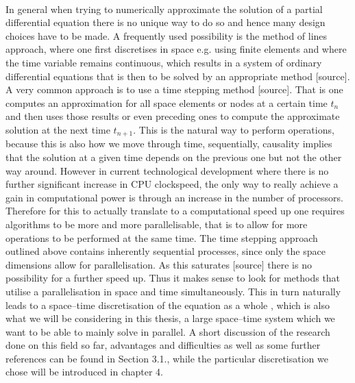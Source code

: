 \documentclass[../draft_1.tex]{subfiles}
\begin{document}
\smallskip
\\
In general when trying to numerically approximate the solution of a partial differential equation there is no unique way to do so and hence many design choices have to be made. A frequently used possibility is the method of lines approach, where one first discretises in space  e.g. using finite elements and where the time variable remains continuous, which results in a system of ordinary differential equations that is then to be solved by an appropriate method [source]. A very common approach is to use a time stepping method [source]. That is one computes an approximation for all space elements or nodes at a certain time $t_n$ and then uses those results or even preceding ones to compute the approximate solution at the next time $t_{n+1}$. This is the natural way to perform operations, because this is also how we move through time, sequentially, causality implies that the solution at a given time depends on the previous one but not the other way around. 
However in current technological development where there is no further significant increase in CPU clockspeed, the only way to really achieve a gain in computational power is through an increase in the number of processors. Therefore for this to actually translate to a computational speed up one requires algorithms to be more and more parallelisable, that is to allow for more operations to be performed at the same time. The time stepping approach outlined above contains inherently sequential processes, since only the space dimensions allow for parallelisation. As this saturates [source] there is no possibility for a further speed up. Thus it makes sense to look for methods that utilise a parallelisation in space and time simultaneously. This in turn naturally leads to a space--time discretisation of the equation as a whole \cite{gander201550}, which is also what we will be considering in this thesis, a large space--time system which we want to be able to mainly solve in parallel. A short discussion of the research done on this field so far, advantages and difficulties as well as some further references can be found in Section 3.1., while the particular discretisation we chose will be introduced in chapter 4.
\bigskip
\\
\end{document}
